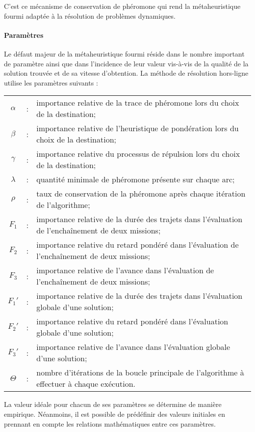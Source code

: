 C'est ce mécanisme de conservation de phéromone qui rend la métaheuristique fourmi adaptée à la résolution de problèmes dynamiques.

\paragraph{Paramètres}

Le défaut majeur de la métaheuristique fourmi réside dans le nombre important de paramètre ainsi que dans l'incidence de leur valeur vis-à-vis de la qualité de la solution trouvée et de sa vitesse d'obtention. La méthode de résolution hors-ligne utilise les paramètres suivants : 

\begin{tabular}{ccp{}}
 $\alpha$ &:& importance relative de la trace de phéromone lors du choix de la destination;\\
 $\beta$ &:& importance relative de l'heuristique de pondération lors du choix de la destination;\\
 $\gamma$ &:& importance relative du processus de répulsion lors du choix de la destination;\\
 $\lambda$ &:& quantité minimale de phéromone présente sur chaque arc;\\
 $\rho$ &:& taux de conservation de la phéromone après chaque itération de l'algorithme;\\
 $F_1$ &:& importance relative de la durée des trajets dans l'évaluation de l'enchaînement de deux missions;\\
 $F_2$ &:& importance relative du retard pondéré dans l'évaluation de l'enchaînement de deux missions;\\
 $F_3$ &:& importance relative de l'avance dans l'évaluation de l'enchaînement de deux missions;\\
 $F_1'$ &:& importance relative de la durée des trajets dans l'évaluation globale d'une solution;\\
 $F_2'$ &:& importance relative du retard pondéré dans l'évaluation globale d'une solution;\\
 $F_3'$ &:& importance relative de l'avance dans l'évaluation globale d'une solution;\\
 $\Theta$ &:& nombre d'itérations de la boucle principale de l'algorithme à effectuer à chaque exécution.
\end{tabular}

La valeur idéale pour chacun de ses paramètres se détermine de manière empirique. Néanmoins, il est possible de prédéfinir des valeurs initiales en prennant en compte les relations mathématiques entre ces paramètres.\\


